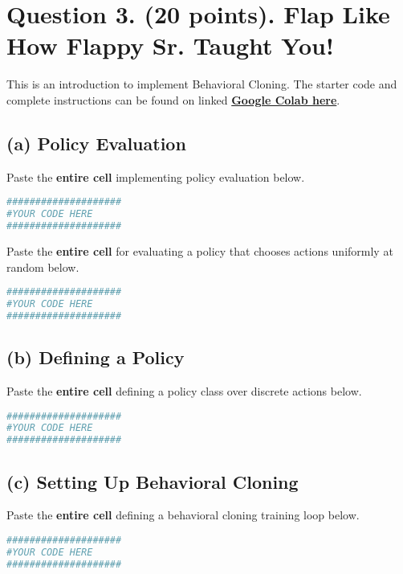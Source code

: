 \documentclass{article}
\begin{document}
\section*{Question 3. (20 points). Flap Like How Flappy Sr. Taught You! }
This is an introduction to implement Behavioral Cloning.
The starter code and complete instructions can be found on linked \href{https://colab.research.google.com/drive/1tzJ1xJyenFmJ75Sih2WkO7M4mLV-9Ofp?usp=sharing}{\textbf{Google Colab here}}.
        \subsection*{(a) Policy Evaluation} 
            Paste the \textbf{entire cell} implementing policy evaluation below.
            \begin{solution}
                \begin{lstlisting}[language=Python]
####################
#YOUR CODE HERE
####################
                \end{lstlisting}
            \end{solution}

            \noindent
            Paste the \textbf{entire cell} for evaluating a policy that chooses actions uniformly at random below.
            \begin{solution}
                \begin{lstlisting}[language=Python]
####################
#YOUR CODE HERE
####################
                \end{lstlisting}
            \end{solution}
        
        \subsection*{(b) Defining a Policy} 
            Paste the \textbf{entire cell} defining a policy class over discrete actions below.
            \begin{solution}
                \begin{lstlisting}[language=Python]
####################
#YOUR CODE HERE
####################
                \end{lstlisting}
            \end{solution}

        \subsection*{(c) Setting Up Behavioral Cloning} 
            Paste the \textbf{entire cell} defining a behavioral cloning training loop below.
            \begin{solution}
                \begin{lstlisting}[language=Python]
####################
#YOUR CODE HERE
####################
                \end{lstlisting}
            \end{solution}
\end{document}
